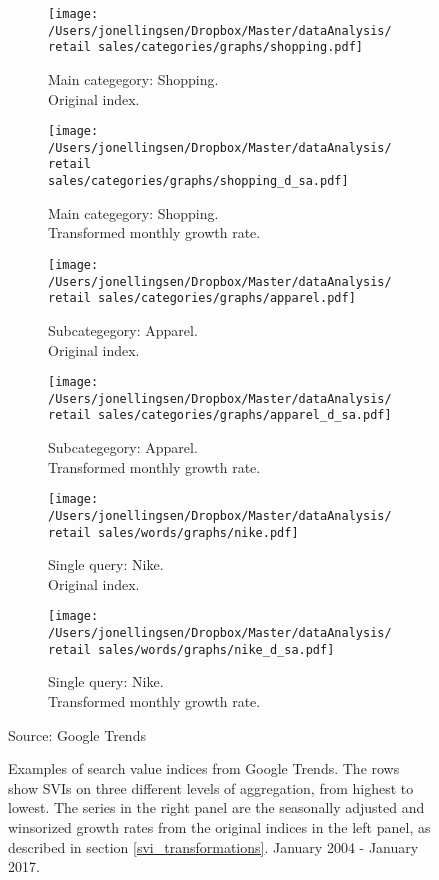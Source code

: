 \begin{adjustbox}{minipage = \linewidth, scale = 0.9, valign=m}
\begin{figure}[H]
\centering
\begin{subfigure}[b]{0.45\textwidth}\caption{Main categegory: Shopping.\\Original index.}
\texttt{[image: /Users/jonellingsen/Dropbox/Master/dataAnalysis/retail sales/categories/graphs/shopping.pdf]}
\end{subfigure}
\begin{subfigure}[b]{0.45\textwidth}\caption{Main categegory: Shopping.\\Transformed monthly growth rate.}
\texttt{[image: /Users/jonellingsen/Dropbox/Master/dataAnalysis/retail sales/categories/graphs/shopping\_d\_sa.pdf]}
\end{subfigure}
\begin{subfigure}[b]{0.45\textwidth}\caption{Subcategegory: Apparel.\\Original index.}
\texttt{[image: /Users/jonellingsen/Dropbox/Master/dataAnalysis/retail sales/categories/graphs/apparel.pdf]}
\end{subfigure}
\begin{subfigure}[b]{0.45\textwidth}\caption{Subcategegory: Apparel.\\Transformed monthly growth rate.}
\texttt{[image: /Users/jonellingsen/Dropbox/Master/dataAnalysis/retail sales/categories/graphs/apparel\_d\_sa.pdf]}
\end{subfigure}
\begin{subfigure}[b]{0.45\textwidth}\caption{Single query: Nike.\\Original index.}
\texttt{[image: /Users/jonellingsen/Dropbox/Master/dataAnalysis/retail sales/words/graphs/nike.pdf]}
\end{subfigure}
\begin{subfigure}[b]{0.45\textwidth}\caption{Single query: Nike.\\Transformed monthly growth rate.}
\texttt{[image: /Users/jonellingsen/Dropbox/Master/dataAnalysis/retail sales/words/graphs/nike\_d\_sa.pdf]}
\end{subfigure}
\caption*{Source: Google Trends}
\caption{Examples of search value indices from Google Trends. The rows show SVIs on three different levels of aggregation, from highest to lowest. The series in the right panel are the seasonally adjusted and winsorized growth rates from the original indices in the left panel, as described in section \ref{svi_transformations}. January 2004 - January 2017.}
\label{trends_graphs}
\end{figure}
\end{adjustbox}


